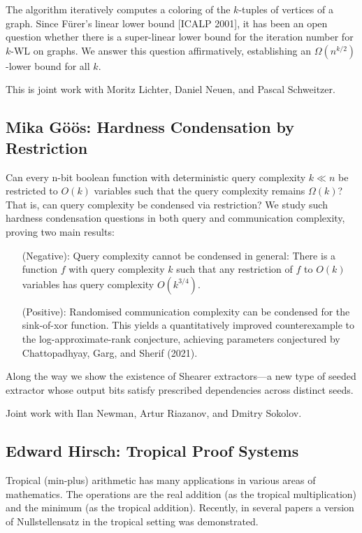 \documentclass[11pt]{article}
\begin{document}
The algorithm iteratively computes a coloring of the $k$-tuples of vertices of a graph. Since F\"{u}rer's linear lower bound [ICALP 2001], it has been an open question whether there is a super-linear lower bound for the iteration number for $k$-WL on graphs. We answer this question affirmatively, establishing an $\Omega(n^{k/2})$-lower bound for all $k$.

This is joint work with Moritz Lichter, Daniel Neuen, and Pascal Schweitzer.

\subsection*{Mika G\"{o}\"{o}s: Hardness Condensation by Restriction}\label{Goos}
Can every n-bit boolean function with deterministic query complexity $k \ll n$ be restricted to $O(k)$ variables such that the query complexity remains $\Omega(k)$? That is, can query complexity be condensed via restriction? We study such hardness condensation questions in both query and communication complexity, proving two main results:
\begin{itemize}
\item[(Negative):] Query complexity cannot be condensed in general: There is a function $f$ with query complexity $k$ such that any restriction of $f$ to $O(k)$ variables has query complexity $O(k^{3/4})$.

\item[(Positive):] Randomised communication complexity can be condensed for the sink-of-xor function. This yields a quantitatively improved counterexample to the log-approximate-rank conjecture, achieving parameters conjectured by Chattopadhyay, Garg, and Sherif (2021).
\end{itemize}
Along the way we show the existence of Shearer extractors---a new type of seeded extractor whose output bits satisfy prescribed dependencies across distinct seeds.

Joint work with Ilan Newman, Artur Riazanov, and Dmitry Sokolov.



\subsection*{Edward Hirsch: Tropical Proof Systems}\label{Hirsch}

Tropical (min-plus) arithmetic has many applications in various areas of mathematics. The operations are the real addition (as the tropical multiplication) and the minimum (as the tropical addition). Recently, in several papers a version of Nullstellensatz in the tropical setting was demonstrated. 
\end{document}

